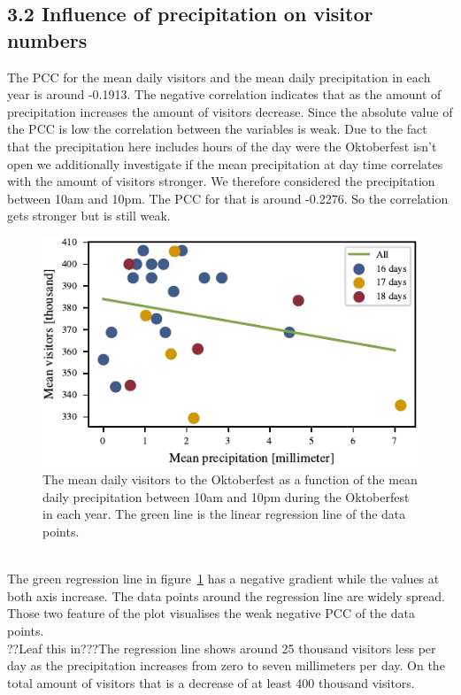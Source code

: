 \documentclass{article}
\theoremstyle{plain}
\theoremstyle{definition}
\theoremstyle{remark}
\begin{document}
\subsection*{3.2 Influence of precipitation on visitor numbers}
The PCC for the mean daily visitors and the mean daily precipitation in each year is around -0.1913. The negative correlation indicates that as the amount of precipitation increases the amount of visitors decrease. Since the absolute value of the PCC is low the correlation between the variables is weak. Due to the fact that the precipitation here includes hours of the day were the Oktoberfest isn't open we additionally investigate if the mean precipitation at day time correlates with the amount of visitors stronger. We therefore considered the precipitation between 10am and 10pm. The PCC for that is around -0.2276. So the correlation gets stronger but is still weak.
\begin{figure}[ht]%
  \includegraphics{fig/totalprecipitation.pdf}
  \caption{The mean daily visitors to the Oktoberfest as a function of the mean daily precipitation between 10am and 10pm during the Oktoberfest in each year. The green line is the linear regression line of the data points.}
  \label{figure_precipitation}
\end{figure}\\
\noindent
The green regression line in figure~\ref{figure_precipitation} has a negative gradient while the values at both axis increase. The data points around the regression line are widely spread. Those two feature of the plot visualises the weak negative PCC of the data points.\\
??Leaf this in???The regression line shows around 25 thousand visitors less per day as the precipitation increases from zero to seven millimeters per day. On the total amount of visitors that is a decrease of at least 400 thousand visitors.\\
\end{document}
